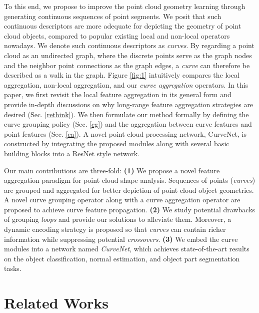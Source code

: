 \documentclass[10pt,twocolumn,letterpaper]{article}
\theoremstyle{definition}
\begin{document}
To this end, we propose to improve the point cloud geometry learning through generating continuous sequences of point segments. We posit that such continuous descriptors are more adequate for depicting the geometry of point cloud objects, compared to popular existing local and non-local operators nowadays. We denote such continuous descriptors as \textit{curves}. By regarding a point cloud as an undirected graph, where the discrete points serve as the graph nodes and the neighbor point connections as the graph edges, a \textit{curve} can therefore be described as a walk in the graph. Figure \ref{fig:1} intuitively compares the local aggregation, non-local aggregation, and our \textit{curve aggregation} operators. In this paper, we first revisit the local feature aggregation in its general form and provide in-depth discussions on why long-range feature aggregation strategies are desired (Sec. \ref{rethink}). We then formulate our method formally by defining the curve grouping policy (Sec. \ref{cg}) and the aggregation between curve features and point features (Sec. \ref{ca}). A novel point cloud processing network, CurveNet, is constructed by integrating the proposed modules along with several basic building blocks into a ResNet \cite{he2016deep} style network. 







Our main contributions are three-fold: \textbf{(1)} We propose a novel feature aggregation paradigm for point cloud shape analysis. Sequences of points (\textit{curves}) are grouped and aggregated for better depiction of point cloud object geometries. A novel curve grouping operator along with a curve aggregation operator are proposed to achieve curve feature propagation. \textbf{(2)} We study potential drawbacks of grouping \textit{loops} and provide our solutions to alleviate them. Moreover, a dynamic encoding strategy is proposed so that \textit{curves} can contain richer information while suppressing potential \textit{crossovers}. \textbf{(3)} We embed the curve modules into a network named \textit{CurveNet}, which achieves state-of-the-art results on the object classification, normal estimation, and object part segmentation tasks. 



\section{Related Works}
\end{document}
